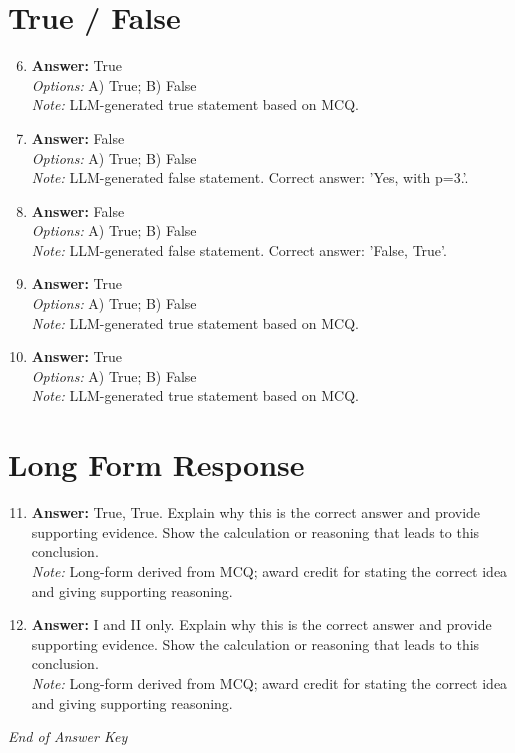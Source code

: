 \documentclass[12pt]{article}
\begin{document}
\section*{True / False}
\begin{enumerate}[label=\arabic*.]
\setcounter{enumi}{5}
\item \textbf{Answer:} True
\\ \textit{Options:} A) True; B) False
\\ \textit{Note:} LLM-generated true statement based on MCQ.
\item \textbf{Answer:} False
\\ \textit{Options:} A) True; B) False
\\ \textit{Note:} LLM-generated false statement. Correct answer: 'Yes, with p=3.'.
\item \textbf{Answer:} False
\\ \textit{Options:} A) True; B) False
\\ \textit{Note:} LLM-generated false statement. Correct answer: 'False, True'.
\item \textbf{Answer:} True
\\ \textit{Options:} A) True; B) False
\\ \textit{Note:} LLM-generated true statement based on MCQ.
\item \textbf{Answer:} True
\\ \textit{Options:} A) True; B) False
\\ \textit{Note:} LLM-generated true statement based on MCQ.
\end{enumerate}

\section*{Long Form Response}
\begin{enumerate}[label=\arabic*.]
\setcounter{enumi}{10}
\item \textbf{Answer:} True, True. Explain why this is the correct answer and provide supporting evidence. Show the calculation or reasoning that leads to this conclusion.
\\ \textit{Note:} Long-form derived from MCQ; award credit for stating the correct idea and giving supporting reasoning.
\item \textbf{Answer:} I and II only. Explain why this is the correct answer and provide supporting evidence. Show the calculation or reasoning that leads to this conclusion.
\\ \textit{Note:} Long-form derived from MCQ; award credit for stating the correct idea and giving supporting reasoning.
\end{enumerate}

\vfill
\noindent\textit{End of Answer Key}
\end{document}
